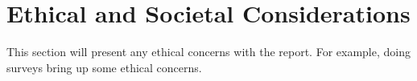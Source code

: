 


\section{Ethical and Societal Considerations}
This section will present any ethical concerns with the report. For example, doing surveys bring up some ethical concerns. 